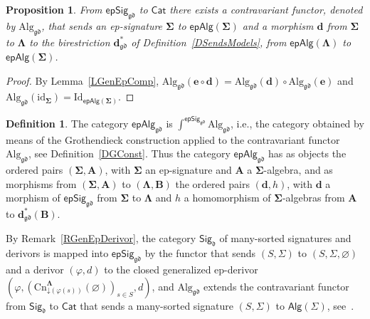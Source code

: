 \documentclass{amsart}
\newcommand{\vs}[1]{\mathbin{\downarrow}#1}
\theoremstyle{plain}
\newtheorem{proposition}[theorem]{Proposition}
\theoremstyle{definition}
\newtheorem{definition}[theorem]{Definition}
\begin{document}
\begin{proposition}\label{PGenAlgFun}
From $\mathsf{epSig}_{\mathfrak{gd}}$ to $\mathsf{Cat}$ there exists a contravariant functor, denoted by $\mathrm{Alg}_{\mathfrak{gd}}$, that sends an ep-signature $\mathbf{\Sigma}$ to $\mathsf{epAlg}(\mathbf{\Sigma})$ and a morphism $\mathbf{d}$ from $\mathbf{\Sigma}$ to $\mathbf{\Lambda}$ to the birestriction $\mathbf{d}^{\ast}_{\mathfrak{gd}}$ of Definition~\ref{DSendsModels}, from $\mathsf{epAlg}(\mathbf{\Lambda})$ to $\mathsf{epAlg}(\mathbf{\Sigma})$.
\end{proposition}
\begin{proof}
By Lemma~\ref{LGenEpComp}, $\mathrm{Alg}_{\mathfrak{gd}}(\mathbf{e}\circ\mathbf{d})=\mathrm{Alg}_{\mathfrak{gd}}(\mathbf{d})\circ\mathrm{Alg}_{\mathfrak{gd}}(\mathbf{e})$ and $\mathrm{Alg}_{\mathfrak{gd}}(\mathrm{id}_{\mathbf{\Sigma}})=\mathrm{Id}_{\mathsf{epAlg}(\mathbf{\Sigma})}$.
\end{proof}

\begin{definition}\label{DEpAlgCat}
The category $\mathsf{epAlg}_{\mathfrak{gd}}$ is $\int^{\mathsf{epSig}_{\scriptscriptstyle\mathfrak{gd}}}\mathrm{Alg}_{\mathfrak{gd}}$, i.e., the category obtained by means of the Grothendieck construction applied to the contravariant functor $\mathrm{Alg}_{\mathfrak{gd}}$, see Definition~\ref{DGConst}. Thus the category $\mathsf{epAlg}_{\mathfrak{gd}}$ has as objects the ordered pairs $(\mathbf{\Sigma},\mathbf{A})$, with $\mathbf{\Sigma}$ an ep-signature and $\mathbf{A}$ a $\mathbf{\Sigma}$-algebra, and as morphisms from $(\mathbf{\Sigma},\mathbf{A})$ to $(\mathbf{\Lambda},\mathbf{B})$ the ordered pairs $(\mathbf{d},h)$, with $\mathbf{d}$ a morphism of $\mathsf{epSig}_{\mathfrak{gd}}$ from $\mathbf{\Sigma}$ to $\mathbf{\Lambda}$ and $h$ a homomorphism of $\mathbf{\Sigma}$-algebras from $\mathbf{A}$ to $\mathbf{d}^{\ast}_{\mathfrak{gd}}(\mathbf{B})$.
\end{definition}

By Remark~\ref{RGenEpDerivor}, the category $\mathsf{Sig}_{\mathfrak{d}}$ of many-sorted signatures and derivors is mapped into $\mathsf{epSig}_{\mathfrak{gd}}$ by the functor that sends $(S,\Sigma)$ to $(S,\Sigma,\varnothing)$ and a derivor $(\varphi,d)$ to the closed generalized ep-derivor $(\varphi,(\mathrm{Cn}^{\mathbf{\Lambda}}_{\vs{(\varphi(s))}}(\varnothing))_{s\in S},d)$, and $\mathrm{Alg}_{\mathfrak{gd}}$ extends the contravariant functor from $\mathsf{Sig}_{\mathfrak{d}}$ to $\mathsf{Cat}$ that sends a many-sorted signature $(S,\Sigma)$ to $\mathsf{Alg}(\Sigma)$, see~\cite{CVST10b}.
\end{document}
